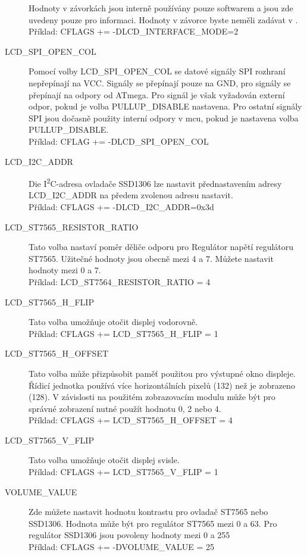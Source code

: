 \begin{description}
Hodnoty v závorkách jsou interně používány pouze softwarem a jsou zde uvedeny pouze pro informaci.
Hodnoty v závorce byste neměli zadávat v .\\
Příklad: CFLAGS += -DLCD\_INTERFACE\_MODE=2
\item[LCD\_SPI\_OPEN\_COL] Pomocí volby LCD\_SPI\_OPEN\_COL se datové signály SPI rozhraní nepřepínají na VCC.
	Signály se přepínají pouze na GND, pro  signály se přepínají na  odpory od ATmega.
Pro  signál je však vyžadován externí odpor, pokud je volba PULLUP\_DISABLE nastavena.
Pro ostatní signály SPI jsou dočasně použity interní  odpory v mcu,
pokud je nastavena volba PULLUP\_DISABLE.\\
Příklad: CFLAG += -DLCD\_SPI\_OPEN\_COL
\item[LCD\_I2C\_ADDR] Die I\textsuperscript{2}C-adresa ovladače SSD1306 lze nastavit přednastavením adresy
LCD\_\discretionary{}{}{}I2C\_\discretionary{}{}{}ADDR na předem zvolenou adresu nastavit.\\
Příklad: CFLAGS += -DLCD\_I2C\_ADDR=0x3d
\item[LCD\_ST7565\_RESISTOR\_RATIO] Tato volba nastaví poměr děliče odporu pro
Regulátor napětí regulátoru ST7565. Užitečné hodnoty jsou obecně mezi 4 a 7.
Můžete nastavit hodnoty mezi 0 a 7. \\
Příklad: LCD\_ST7564\_RESISTOR\_RATIO = 4
\item[LCD\_ST7565\_H\_FLIP] Tato volba umožňuje otočit displej vodorovně.\\
Příklad: CFLAGS += LCD\_ST7565\_H\_FLIP = 1
\item[LCD\_ST7565\_H\_OFFSET] Tato volba může přizpůsobit paměť použitou pro výstupné okno displeje.
Řídicí jednotka používá více horizontálních pixelů (132) než je zobrazeno (128).
V závislosti na použitém zobrazovacím modulu může být pro správné zobrazení nutné použít hodnotu 0, 2 nebo 4.\\
Příklad: CFLAGS += LCD\_ST7565\_H\_OFFSET = 4
\item[LCD\_ST7565\_V\_FLIP] Tato volba umožňuje otočit displej svisle.\\
Příklad: CFLAGS += LCD\_ST7565\_V\_FLIP = 1
\item[VOLUME\_VALUE] Zde můžete nastavit hodnotu kontrastu pro ovladač ST7565 nebo SSD1306.
Hodnota může být pro regulátor ST7565 mezi 0 a 63.
Pro regulátor SSD1306 jsou povoleny hodnoty mezi 0 a 255 \\
Příklad: CFLAGS += -DVOLUME\_VALUE = 25

\end{description}
